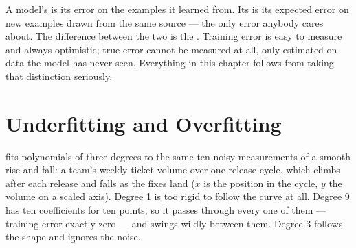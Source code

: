 A model's  is its error on the examples it learned from. Its
 is its expected error on new examples drawn from the same
source --- the only error anybody cares about. The difference between the two is
the . Training error is easy to measure and always
optimistic; true error cannot be measured at all, only estimated on data the
model has never seen. Everything in this chapter follows from taking that
distinction seriously.

\section{Underfitting and Overfitting}

 fits polynomials of three degrees to the same ten noisy
measurements of a smooth rise and fall: a team's weekly ticket volume over one
release cycle, which climbs after each release and falls as the fixes land ($x$ is
the position in the cycle, $y$ the volume on a scaled axis). Degree 1 is too rigid
to follow the curve at all. Degree 9 has ten
coefficients for ten points, so it passes through every one of them --- training
error exactly zero --- and swings wildly between them. Degree 3 follows the shape
and ignores the noise.

